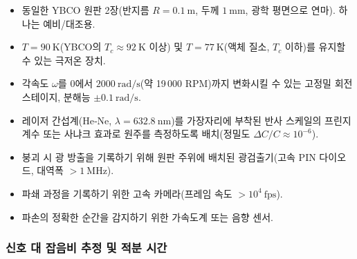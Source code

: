 \documentclass[12pt,a4paper]{article}
\begin{document}
	\begin{itemize}
		\item 동일한 YBCO 원판 2장(반지름 \(R = 0.1\ \text{m}\), 두께 \(1\ \text{mm}\), 광학 평면으로 연마). 하나는 예비/대조용.
		\item \(T = 90\ \text{K}\)(YBCO의 \(T_c \approx 92\ \text{K}\) 이상) 및 \(T = 77\ \text{K}\)(액체 질소, \(T_c\) 이하)를 유지할 수 있는 극저온 장치.
		\item 각속도 \(\omega\)를 \(0\)에서 \(2000\ \text{rad/s}\)(약 19 000 RPM)까지 변화시킬 수 있는 고정밀 회전 스테이지, 분해능 \(\pm 0.1\ \text{rad/s}\).
		\item 레이저 간섭계(He‑Ne, \(\lambda = 632.8\ \text{nm}\))를 가장자리에 부착된 반사 스케일의 프린지 계수 또는 사냐크 효과로 원주를 측정하도록 배치(정밀도 \(\Delta C/C \approx 10^{-6}\)).
		\item 붕괴 시 광 방출을 기록하기 위해 원판 주위에 배치된 광검출기(고속 PIN 다이오드, 대역폭 \(> 1\ \text{MHz}\)).
		\item 파쇄 과정을 기록하기 위한 고속 카메라(프레임 속도 \(> 10^4\ \text{fps}\)).
		\item 파손의 정확한 순간을 감지하기 위한 가속도계 또는 음향 센서.
	\end{itemize}
	
	\subsubsection{신호 대 잡음비 추정 및 적분 시간}
	
\end{document}
